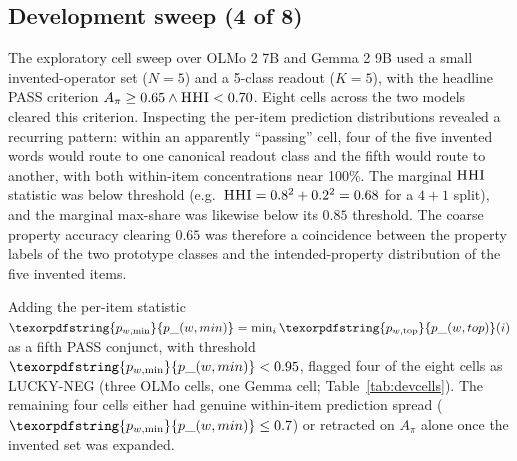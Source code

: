 \documentclass[11pt,letterpaper]{article}
\newcommand{\pwtop}{\texorpdfstring{\ensuremath{p_{w,\text{top}}}}{p\_(w,top)}}
\newcommand{\pwmin}{\texorpdfstring{\ensuremath{p_{w,\min}}}{p\_(w,min)}}
\newcommand{\hhi}{\textsc{HHI}}
\begin{document}
\subsection{Development sweep (4 of 8)}
\label{sec:dev}

The exploratory cell sweep over OLMo 2 7B and Gemma 2 9B used a
small invented-operator set ($N = 5$) and a 5-class readout
($K = 5$), with the headline PASS criterion
$A_\pi \geq 0.65 \wedge \hhi < 0.70$. Eight cells across the two
models cleared this criterion. Inspecting the per-item prediction
distributions revealed a recurring pattern: within an apparently
``passing'' cell, four of the five invented words would route to one
canonical readout class and the fifth would route to another, with
both within-item concentrations near 100\%. The marginal $\hhi$
statistic was below threshold (e.g.\ $\hhi = 0.8^2 + 0.2^2 = 0.68$
for a $4{+}1$ split), and the marginal max-share was likewise below
its $0.85$ threshold. The coarse property accuracy clearing $0.65$
was therefore a coincidence between the property labels of the two
prototype classes and the intended-property distribution of the five
invented items.

Adding the per-item statistic
$\pwmin = \min_i \pwtop(i)$ as a fifth PASS conjunct, with threshold
$\pwmin < 0.95$, flagged four of the eight cells as LUCKY-NEG
(three OLMo cells, one Gemma cell;
Table~\ref{tab:devcells}). The remaining four cells either had
genuine within-item prediction spread ($\pwmin \leq 0.7$) or
retracted on $A_\pi$ alone once the invented set was expanded.
\end{document}

